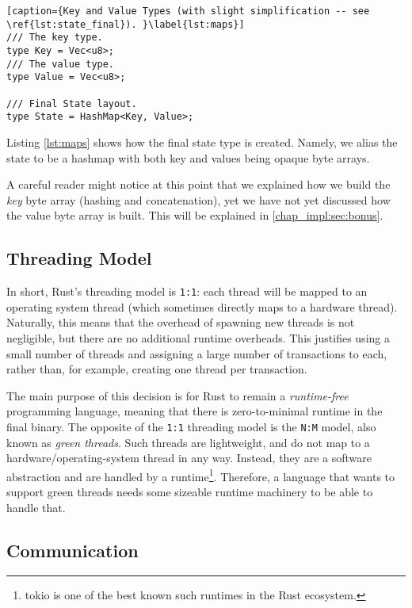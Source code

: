\begin{lstlisting}[caption={Key and Value Types (with slight simplification -- see \ref{lst:state_final}). }\label{lst:maps}]
/// The key type.
type Key = Vec<u8>;
/// The value type.
type Value = Vec<u8>;

/// Final State layout.
type State = HashMap<Key, Value>;
\end{lstlisting}

Listing \ref{lst:maps} shows how the final state type is created. Namely, we alias the state to be a
hashmap with both key and values being opaque byte arrays.

\begin{remark}
	A careful reader might notice at this point that we explained how we build the \textit{key} byte
	array (hashing and concatenation), yet we have not yet discussed how the value byte array is
	built. This will be explained in \ref{chap_impl:sec:bonus}.
\end{remark}

\subsection{Threading Model}

In short, Rust's threading model is \texttt{1:1}: each thread will be mapped to an operating system
thread (which sometimes directly maps to a hardware thread). Naturally, this means that the overhead
of spawning new threads is not negligible, but there are no additional runtime overheads. This
justifies using a small number of threads and assigning a large number of transactions to each,
rather than, for example, creating one thread per transaction.

The main purpose of this decision is for Rust to remain a \textit{runtime-free} programming
language\cite{RustJourneyAsync}, meaning that there is zero-to-minimal runtime in the final binary.
The opposite of the \texttt{1:1} threading model is the \texttt{N:M} model, also known as
\textit{green threads}. Such threads are lightweight, and do not map to a hardware/operating-system
thread in any way. Instead, they are a software abstraction and are handled by a
runtime\footnote{tokio is one of the best known such runtimes in the Rust
ecosystem\cite{TokioRust}.}. Therefore, a language that wants to support green threads needs some
sizeable runtime machinery to be able to handle that.

\subsection{Communication}

